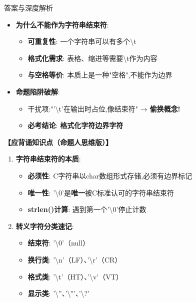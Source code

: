\documentclass[a4paper,12pt]{article}
\begin{document}
\begin{bluebox}{答案与深度解析}
\begin{itemize}[leftmargin=*, nosep]
		\item \textbf{为什么不能作为字符串结束符}:
		      \begin{itemize}
			      \item \textbf{可重复性}: 一个字符串可以有多个\textbackslash t
			      \item \textbf{格式化需求}: 表格、缩进等需要\textbackslash t作为内容
			      \item \textbf{与空格等价}: 本质上是一种"空格",不能作为边界
		      \end{itemize}

		\item \textbf{命题陷阱破解}:
		      \begin{itemize}
			      \item 干扰项:"'\textbackslash t'在输出时占位,像结束符" → \textbf{偷换概念!}
			      \item \textbf{必考结论}: \textbf{格式化字符\neq 边界字符}
		      \end{itemize}
	\end{itemize}

	\textbf{【应背诵知识点（命题人思维版）】}
	\begin{enumerate}[leftmargin=*, nosep]
		\item \textbf{字符串结束符的本质}:
		      \begin{itemize}
			      \item \textbf{必须性}: C字符串以char数组形式存储,必须有边界标记
			      \item \textbf{唯一性}: '\textbackslash0'是\textbf{唯一}被C标准认可的字符串结束符
			      \item \textbf{strlen()计算}: 遇到第一个'\textbackslash0'停止计数
		      \end{itemize}

		\item \textbf{转义字符分类速记}:
		      \begin{itemize}
			      \item \textbf{结束符}: '\textbackslash0'（null）
			      \item \textbf{换行类}: '\textbackslash n'（LF）、'\textbackslash r'（CR）
			      \item \textbf{格式类}: '\textbackslash t'（HT）、'\textbackslash v'（VT）
			      \item \textbf{显示类}: '\textbackslash ''、'\textbackslash "'、'\textbackslash ?'
		      \end{itemize}


\end{enumerate}
\end{bluebox}
\end{document}
